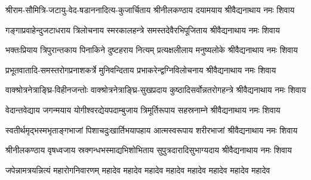 
\twolineshloka
{श्रीराम-सौमित्रि-जटायु-वेद-षडाननादित्य-कुजार्चिताय}
{श्रीनीलकण्ठाय दयामयाय श्रीवैद्यनाथाय नमः शिवाय}

%
\twolineshloka
{गङ्गाप्रवाहेन्दुजटाधराय त्रिलोचनाय स्मरकालहन्त्रे}
{समस्तदेवैरभिपूजिताय श्रीवैद्यनाथाय नमः शिवाय}

\twolineshloka
{भक्तःप्रियाय त्रिपुरान्तकाय पिनाकिने दुष्टहराय नित्यम्}
{प्रत्यक्षलीलाय मनुष्यलोके श्रीवैद्यनाथाय नमः शिवाय}

\twolineshloka
{प्रभूतवातादि-समस्तरोगप्रनाशकर्त्रे मुनिवन्दिताय}
{प्रभाकरेन्द्वग्निविलोचनाय श्रीवैद्यनाथाय नमः शिवाय}

\twolineshloka
{वाक्श्रोत्रनेत्राङ्घ्रि-विहीनजन्तोः वाक्श्रोत्रनेत्राङ्घ्रि-सुखप्रदाय}
{कुष्ठादिसर्वोन्नतरोगहन्त्रे श्रीवैद्यनाथाय नमः शिवाय}

\twolineshloka
{वेदान्तवेद्याय जगन्मयाय योगीश्वरद्येयपदाम्बुजाय}
{त्रिमूर्तिरूपाय सहस्रनाम्ने श्रीवैद्यनाथाय नमः शिवाय}

\twolineshloka
{स्वतीर्थमृद्भस्मभृताङ्गभाजां पिशाचदुःखार्तिभयापहाय}
{आत्मस्वरूपाय शरीरभाजां श्रीवैद्यनाथाय नमः शिवाय}

\twolineshloka
{श्रीनीलकण्ठाय वृषध्वजाय स्रक्गन्धभस्माद्यभिशोभिताय}
{सुपुत्रदारादिसुभाग्यदाय श्रीवैद्यनाथाय नमः शिवाय}

{जपेन्नामत्रयन्नित्यं महारोगनिवारणम्}
{महादेव महादेव महादेव महादेव महादेव महादेव महादेव महादेव}
